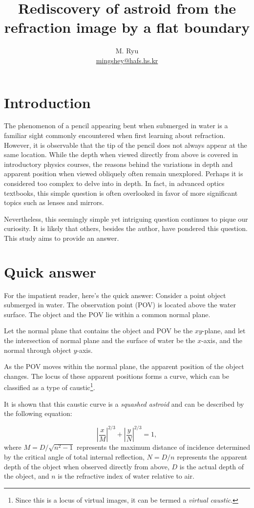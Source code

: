 \documentclass[twocolumn]{article}
\title{Rediscovery of astroid from the refraction image by a flat boundary}
\author{M. Ryu \\ {\href{mailto:mingshey@hafs.hs.kr}{mingshey@hafs.hs.kr}}}
\begin{document}
\maketitle
\section{Introduction}
The phenomenon of a pencil appearing bent when submerged in water is a 
familiar sight commonly encountered when first learning about refraction. 
However, it is observable that the tip of the pencil does not always appear 
at the same location. While the depth when viewed directly from above is 
covered in introductory physics courses, the reasons behind the variations 
in depth and apparent position when viewed obliquely often remain unexplored. 
Perhaps it is considered too complex to delve into in depth. In fact, in 
advanced optics textbooks, this simple question is often overlooked in favor 
of more significant topics such as lenses and mirrors.

Nevertheless, this seemingly simple yet intriguing question continues to 
pique our curiosity. It is likely that others, besides the author, have 
pondered this question. This study aims to provide an answer.

\section{Quick answer}
For the impatient reader, here's the quick answer:
Consider a point object submerged in water. The observation point (POV) is 
located above the water surface. The object and the POV lie within a common normal plane. 

Let the normal plane that contains the object and  POV be the $xy$-plane,
and let the intersection of  normal plane and the surface of water be the 
$x$-axis, and the normal through  object $y$-axis.

As the POV moves within the normal plane, the apparent position of the 
object changes. The locus of these apparent positions forms a curve, 
which can be classified as a type of caustic\footnote{Since this is a 
locus of virtual images, it can be termed a \emph{virtual caustic}.}. 

It is shown that this caustic curve is a \emph{squashed astroid}
and can be described by the following equation:

$$ \left| \dfrac{x}{M} \right| ^ {2/3} + \left| \dfrac{y}{N} \right| ^ {2/3} = 1,$$
where 
$M = D/\sqrt{n^2 - 1}$ represents the maximum distance of incidence determined 
by the critical angle of total internal reflection, 
$N = D/n$ represents the apparent depth of the object when observed directly 
from above,
$D$ is the actual depth of the object, and
$n$ is the refractive index of water relative to air.
\end{document}
